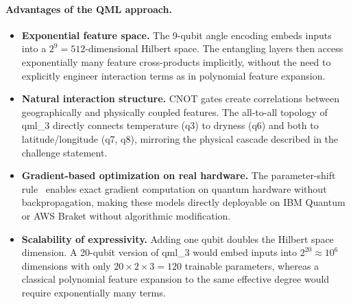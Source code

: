 \documentclass[11pt,a4paper]{article}
\begin{document}
\paragraph{Advantages of the QML approach.}
\begin{itemize}[leftmargin=*]
    \item \textbf{Exponential feature space.} The 9-qubit angle encoding embeds
          inputs into a $2^9 = 512$-dimensional Hilbert space. The entangling
          layers then access exponentially many feature cross-products implicitly,
          without the need to explicitly engineer interaction terms as in polynomial
          feature expansion.
    \item \textbf{Natural interaction structure.} CNOT gates create correlations
          between geographically and physically coupled features. The all-to-all
          topology of qml\_3 directly connects temperature (q3) to dryness (q6)
          and both to latitude/longitude (q7, q8), mirroring the physical
          cascade described in the challenge statement.
    \item \textbf{Gradient-based optimization on real hardware.} The parameter-shift
          rule~\cite{mitarai2018quantum} enables exact gradient computation on
          quantum hardware without backpropagation, making these models directly
          deployable on IBM Quantum or AWS Braket without algorithmic modification.
    \item \textbf{Scalability of expressivity.} Adding one qubit doubles the Hilbert
          space dimension. A 20-qubit version of qml\_3 would embed inputs into
          $2^{20} \approx 10^6$ dimensions with only $20 \times 2 \times 3 = 120$
          trainable parameters, whereas a classical polynomial feature expansion
          to the same effective degree would require exponentially many terms.
\end{itemize}
\end{document}
